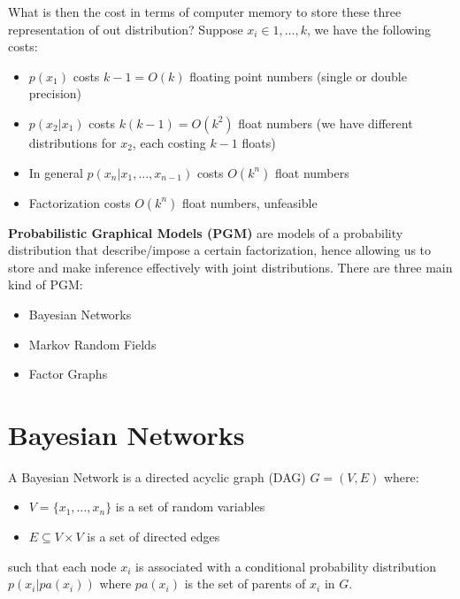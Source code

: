What is then the cost in terms of computer memory to store these three representation of out distribution? Suppose $x_i \in {1, \dots, k}$, we have the following costs:
\begin{itemize}
    \item $p(x_1)$ costs $k-1 = O(k)$ floating point numbers (single or double precision)
    \item $p(x_2|x_1)$ costs $k(k-1) = O(k^2)$ float numbers (we have different distributions for $x_2$, each costing $k-1$ floats)
    \item In general $p(x_n|x_1,\dots, x_{n-1})$ costs $O(k^n)$ float numbers 
    \item Factorization costs $O(k^n)$ float numbers, unfeasible 
\end{itemize}


\textbf{Probabilistic Graphical Models (PGM)} are models of a probability distribution that describe/impose a certain factorization, hence allowing us to store and make inference effectively with joint distributions. There are three main kind of PGM:
\begin{itemize}
    \item Bayesian Networks
    \item Markov Random Fields
    \item Factor Graphs
\end{itemize}

\section{Bayesian Networks}

\begin{definitionblock}
    A Bayesian Network is a directed acyclic graph (DAG) $G = (V,E)$ where:
    \begin{itemize}
        \item $V = \{x_1,\dots, x_n\}$ is a set of random variables
        \item $E \subseteq V \times V$ is a set of directed edges
    \end{itemize}
    such that each node $x_i$ is associated with a conditional probability distribution $p(x_i|pa(x_i))$ where $pa(x_i)$ is the set of parents of $x_i$ in $G$.
\end{definitionblock}

